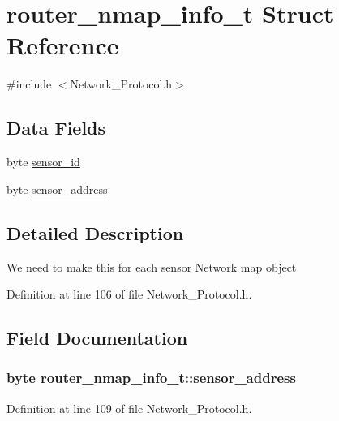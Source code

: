 \hypertarget{structrouter__nmap__info__t}{\section{router\-\_\-nmap\-\_\-info\-\_\-t Struct Reference}
\label{structrouter__nmap__info__t}
}


{\ttfamily \#include $<$Network\-\_\-\-Protocol.\-h$>$}

\subsection*{Data Fields}
\begin{DoxyCompactItemize}
\item 
byte \hyperlink{structrouter__nmap__info__t_a14d6e480e14c770acb5b1981b3e5b186}{sensor\-\_\-id}
\item 
byte \hyperlink{structrouter__nmap__info__t_a47a696d6ee73eed291ae23fcffff99d3}{sensor\-\_\-address}
\end{DoxyCompactItemize}


\subsection{Detailed Description}
We need to make this for each sensor Network map object 

Definition at line 106 of file Network\-\_\-\-Protocol.\-h.



\subsection{Field Documentation}
\hypertarget{structrouter__nmap__info__t_a47a696d6ee73eed291ae23fcffff99d3}{
\subsubsection[{sensor\-\_\-address}]{\setlength{\rightskip}{0pt plus 5cm}byte router\-\_\-nmap\-\_\-info\-\_\-t\-::sensor\-\_\-address}}\label{structrouter__nmap__info__t_a47a696d6ee73eed291ae23fcffff99d3}


Definition at line 109 of file Network\-\_\-\-Protocol.\-h.


